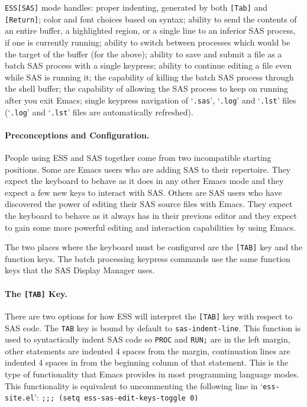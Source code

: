\documentclass{article}
\newcommand{\stexttt}[1]{{\small\texttt{#1}}}
\newcommand{\file}[1]{`\stexttt{#1}'}
\begin{document}
\stexttt{ESS[SAS]} mode
handles: proper indenting, generated by both \stexttt{[Tab]} and
\stexttt{[Return]}; color and font choices based on syntax; ability to send
the contents of an entire buffer, a highlighted region, or a single
line to an inferior SAS process, if one is currently running; ability
to switch between processes which would be the target of the buffer
(for the above); ability to save and submit a file
as a batch SAS process with a single keypress; ability to continue
editing a file even while SAS is running it;
the capability of killing the batch SAS
process through the shell buffer; the capability of allowing the
SAS process to keep on
running after you exit Emacs; single keypress navigation of \file{.sas},
\file{.log} and \file{.lst} files (\file{.log} and \file{.lst}
files are automatically refreshed).


\paragraph{Preconceptions and Configuration.}

People using ESS and SAS together come from two incompatible starting positions.
Some are Emacs users who are adding SAS to their repertoire.  They expect the 
keyboard to behave as it does in any other Emacs mode and they expect a few new
keys to interact with SAS.  Others are SAS users who have discovered the
power of editing their SAS source files with Emacs.  They expect the keyboard
to behave as it always has in their previous editor and they expect to gain some
more powerful editing and interaction capabilities by using Emacs.

The two places where the keyboard must be configured are the
\texttt{[TAB]} key and the function keys.  The batch processing
keypress commands use the same function keys that the SAS Display
Manager uses.

\paragraph{The \texttt{[TAB]} Key.}
\label{sec:SAS:tab}

There are two options for how ESS will interpret the \stexttt{[TAB]} key
with respect to SAS code.  The \stexttt{TAB} key is bound by default to
\stexttt{sas-indent-line}.  This function is used to syntactically indent SAS
code so \stexttt{PROC} and \stexttt{RUN;} are in the left margin, other
statements are indented 4 spaces from the margin, continuation lines
are indented 4 spaces in from the beginning column of that statement.
This is the type of functionality that Emacs provides in most
programming language modes.  This functionality is equivalent to
uncommenting the following line in \file{ess-site.el}:
\stexttt{;;; (setq ess-sas-edit-keys-toggle 0)}
\end{document}
